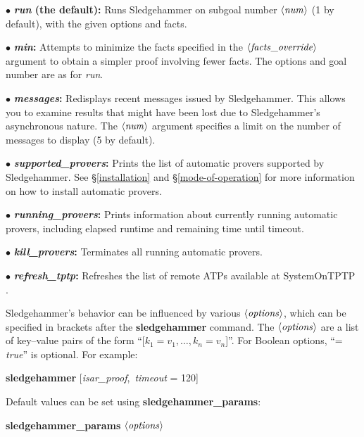 \documentclass[a4paper,12pt]{article}
\def\qty#1{\ensuremath{\left<\mathit{#1\/}\right>}}
\begin{document}
\begin{enum}
\item[$\bullet$] \textbf{\textit{run} (the default):} Runs Sledgehammer on
subgoal number \qty{num} (1 by default), with the given options and facts.

\item[$\bullet$] \textbf{\textit{min}:} Attempts to minimize the facts
specified in the \qty{facts\_override} argument to obtain a simpler proof
involving fewer facts. The options and goal number are as for \textit{run}.

\item[$\bullet$] \textbf{\textit{messages}:} Redisplays recent messages issued
by Sledgehammer. This allows you to examine results that might have been lost
due to Sledgehammer's asynchronous nature. The \qty{num} argument specifies a
limit on the number of messages to display (5 by default).

\item[$\bullet$] \textbf{\textit{supported\_provers}:} Prints the list of
automatic provers supported by Sledgehammer. See \S\ref{installation} and
\S\ref{mode-of-operation} for more information on how to install automatic
provers.

\item[$\bullet$] \textbf{\textit{running\_provers}:} Prints information about
currently running automatic provers, including elapsed runtime and remaining
time until timeout.

\item[$\bullet$] \textbf{\textit{kill\_provers}:} Terminates all running
automatic provers.

\item[$\bullet$] \textbf{\textit{refresh\_tptp}:} Refreshes the list of remote
ATPs available at System\-On\-TPTP \cite{sutcliffe-2000}.
\end{enum}

Sledgehammer's behavior can be influenced by various \qty{options}, which can be
specified in brackets after the \textbf{sledgehammer} command. The
\qty{options} are a list of key--value pairs of the form ``[$k_1 = v_1,
\ldots, k_n = v_n$]''. For Boolean options, ``= \textit{true}'' is optional. For
example:

\prew
\textbf{sledgehammer} [\textit{isar\_proof}, \,\textit{timeout} = 120]
\postw

Default values can be set using \textbf{sledgehammer\_\allowbreak params}:

\prew
\textbf{sledgehammer\_params} \qty{options}
\postw
\end{document}
